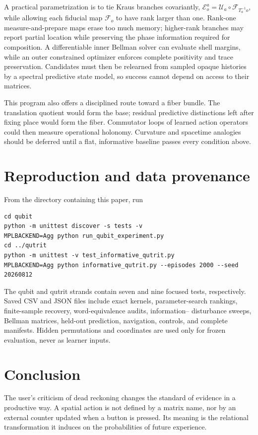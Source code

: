 \documentclass[11pt]{article}
\theoremstyle{definition}
\theoremstyle{remark}
\newcommand{\cE}{\mathcal E}
\newcommand{\cU}{\mathcal U}
\begin{document}
A practical parametrization is to tie Kraus branches covariantly,
\(\cE^{a}_{o}=\cU_a\circ\mathcal F_{T_a^{-1}o}\), while allowing each fiducial map
\(\mathcal F_o\) to have rank larger than one. Rank-one measure-and-prepare maps
erase too much memory; higher-rank branches may report partial location while
preserving the phase information required for composition.  A differentiable
inner Bellman solver can evaluate shell margins, while an outer constrained
optimizer enforces complete positivity and trace preservation.  Candidates
must then be relearned from sampled opaque histories by a spectral predictive
state model, so success cannot depend on access to their matrices.

This program also offers a disciplined route toward a fiber bundle.  The
translation quotient would form the base; residual predictive distinctions
left after fixing place would form the fiber.  Commutator loops of learned
action operators could then measure operational holonomy.  Curvature and
spacetime analogies should be deferred until a flat, informative baseline
passes every condition above.

\section{Reproduction and data provenance}

From the directory containing this paper, run
\begin{verbatim}
cd qubit
python -m unittest discover -s tests -v
MPLBACKEND=Agg python run_qubit_experiment.py
cd ../qutrit
python -m unittest -v test_informative_qutrit.py
MPLBACKEND=Agg python informative_qutrit.py --episodes 2000 --seed 20260812
\end{verbatim}
The qubit and qutrit strands contain seven and nine focused tests,
respectively.  Saved CSV and JSON files include exact kernels, parameter-search
rankings, finite-sample recovery, word-equivalence audits, information--
disturbance sweeps, Bellman matrices, held-out prediction, navigation, controls,
and complete manifests.  Hidden permutations and coordinates are used only
for frozen evaluation, never as learner inputs.

\section{Conclusion}

The user's criticism of dead reckoning changes the standard of evidence in a
productive way.  A spatial action is not defined by a matrix name, nor by an
external counter updated when a button is pressed.  Its meaning is the
relational transformation it induces on the probabilities of future
experience.
\end{document}
